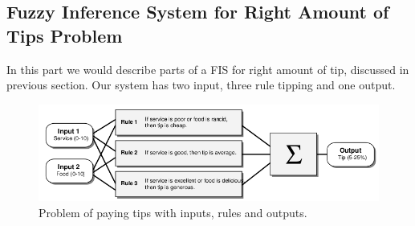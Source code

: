 \documentclass{article}
\begin{document}
\subsection{Fuzzy Inference System for Right Amount of Tips Problem}
In this part we would describe parts of a FIS for right amount of tip, discussed in previous section.
Our system has two input, three rule tipping and one output.
\begin{figure}[H]
\begin{center}
\includegraphics[scale=0.5]{./images/fis_paying_tip.png}
\caption{Problem of paying tips with inputs, rules and outputs.}
\label{fis_paying_tip}
\end{center}
\end{figure}
\end{document}
